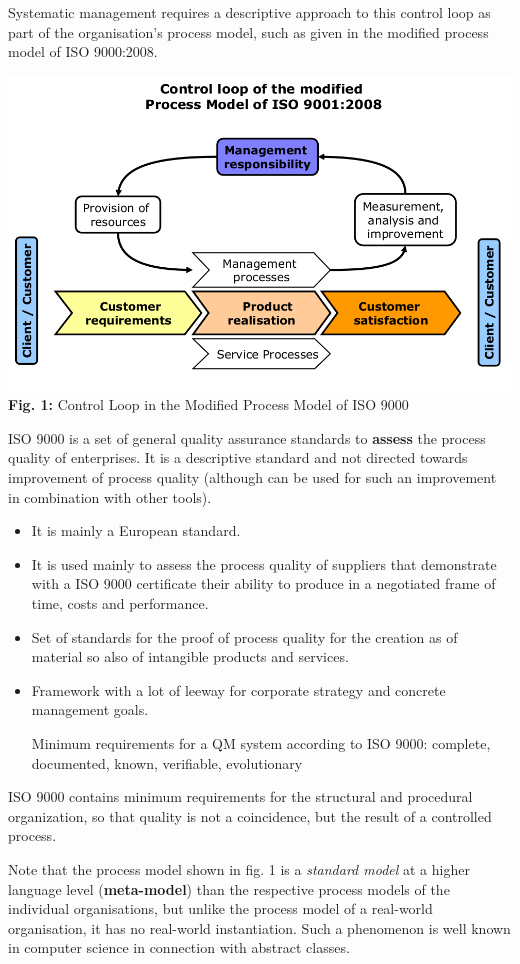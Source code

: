\documentclass[11pt,a4paper]{article}
\begin{document}
Systematic management requires a descriptive approach to this control loop as
part of the organisation's process model, such as given in the modified
process model of ISO 9000:2008.
\begin{center}
  \includegraphics[width=.8\textwidth]{2.png}\\ \textbf{Fig. 1:} Control Loop
  in the Modified Process Model of ISO 9000
\end{center}
ISO 9000 is a set of general quality assurance standards to \textbf{assess}
the process quality of enterprises. It is a descriptive standard and not
directed towards improvement of process quality (although can be used for such
an improvement in combination with other tools).
\begin {itemize} 
\item It is mainly a European standard.
\item It is used mainly to assess the process quality of suppliers that
  demonstrate with a ISO 9000 certificate their ability to produce in a
  negotiated frame of time, costs and performance. 
\item Set of standards for the proof of process quality for the creation as of
  material so also of intangible products and services.
\item Framework with a lot of leeway for corporate strategy and concrete
  management goals.

  Minimum requirements for a QM system according to ISO 9000: complete,
  documented, known, verifiable, evolutionary
\end {itemize}
ISO 9000 contains minimum requirements for the structural and procedural
organization, so that quality is not a coincidence, but the result of a
controlled process.

Note that the process model shown in fig. 1 is a \emph{standard model} at a
higher language level (\textbf{meta-model}) than the respective process models
of the individual organisations, but unlike the process model of a real-world
organisation, it has no real-world instantiation. Such a phenomenon is well
known in computer science in connection with abstract classes.
\end{document}
